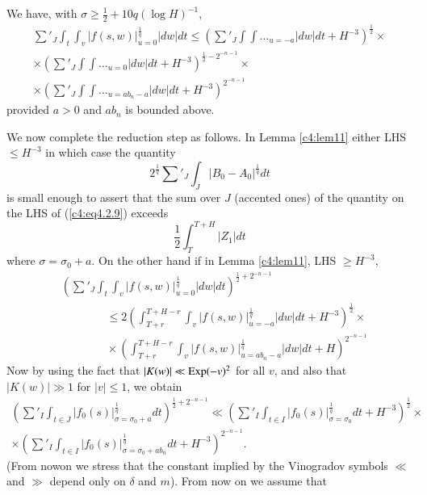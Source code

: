 \begin{lem}\label{c4:lem11}
We have, with $\sigma \geq \frac{1}{2} + 10 q(\log H)^{-1}$,
\begin{gather*}
\sum'_J \int_t \int_v |f(s,w)|^{\frac{1}{q}}_{u=0} |dw| dt \leq \left(\sum'_J  \int \int \ldots_{u = -a} |dw| dt + H^{-3}\right)^{\frac{1}{2}} \times \\
\times \left( \sum'_J \int \int \ldots_{u=0} |dw| dt + H^{-3} \right)^{\frac{1}{2} - 2^{-n-1}} \times  \\
\times \left( \sum'_J \int \int \ldots_{u = a b_n-a} |dw| dt + H^{-3} \right)^{2^{-n-1}}  \tag{4.2.14}\label{c4:eq4.2.14}
\end{gather*}\pageoriginale
provided $a>0$ and $ab_n$ is bounded above.
\end{lem}

We now complete the reduction step as follows. In Lemma \ref{c4:lem11} either LHS $\leq H^{-3}$ in which case the quantity
$$
2^{\frac{1}{q}} \sum'_J \int_J |B_0 - A_0|^{\frac{1}{q}} dt
$$
is small enough to assert that the sum over $J$ (accented ones) of the quantity on the LHS of (\ref{c4:eq4.2.9}) exceeds
$$
\frac{1}{2} \int^{T+H}_T |Z_1| dt
$$
where $\sigma = \sigma_0 + a$. On the other hand if in Lemma \ref{c4:lem11}, LHS $\geq H^{-3}$,
\begin{align*}
& \left( \sum'_J \int_t \int_v |f(s,w)|^{\frac{1}{q}}_{u=0} |dw| dt\right)^{\frac{1}{2} + 2^{-n-1}}\\
& \qquad \qquad \leq 2 \left(\int^{T + H -r}_{T+r}  \int_v |f(s,w)|^{\frac{1}{q}}_{u=-a} |dw| dt + H^{-3} \right)^{\frac{1}{2}} \times \\
& \qquad \qquad  \times \left(\int^{T+H-r}_{T+r} \int_v |f(s,w)|^{\frac{1}{q}}_{u=ab_n-a} |dw| dt + H\right)^{2^{-n-1}}
\end{align*}
Now by using the fact that $|K(w)| \ll \operatorname{Exp} (-v)^2$ for all $v$, and also that $|K(w)|\gg 1$ for $|v| \leq 1$, we obtain
\begin{gather*}
\left(\sum'_I \int_{t \in J} |f_0 (s)|^{\frac{1}{q}}_{\sigma = \sigma_0 +a} dt\right)^{\frac{1}{2} + 2^{-n-1}} \ll \left(\sum'_I \int_{t \in I} |f_0 (s)|^{\frac{1}{q}}_{\sigma = \sigma_0} dt + H^{-3}\right)^{\frac{1}{2}} \times\\
\times \left(\sum'_I \int_{t \in I} |f_0(s)|^{\frac{1}{q}}_{\sigma = \sigma_0 + a b_n} dt + H^{-3} \right)^{2^{-n-1}} .\tag{4.2.15} \label{c4:eq4.2.15}
\end{gather*}
(From now\pageoriginale on we stress that the constant implied by the Vinogradov symbols $\ll$ and  $\gg$ depend only on $\delta$ and $m$). From now on we assume that
